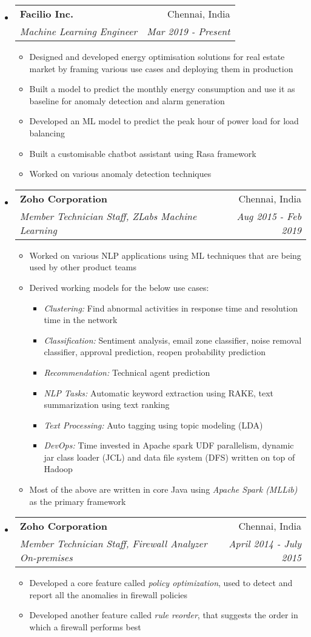 \documentclass[letterpaper,11pt]{article}
\makeatletter
\newcommand{\resitem}[1]{\item #1 \vspace{-2pt}}
\newcommand{\resheading}[1]{\textbf{\sffamily{\mbox{~}{\large #1} \vphantom{p\^{E}}}}}
\newcommand{\ressubheading}[4]{
\begin{tabular*}{6.5in}{l@{\extracolsep{\fill}}r}
		\textbf{#1} & #2 \\
		\textit{#3} & \textit{#4} \\
\end{tabular*}\vspace{-6pt}}
\makeatother
\begin{document}
\vspace{0.05in}
\resheading{Work Experience}
\vspace{-2mm}
\begin{itemize}
\item[]
	\ressubheading{Facilio Inc.}{Chennai, India}{Machine Learning Engineer}{Mar 2019 - Present}
	\begin{itemize}
		\resitem{Designed and developed energy optimisation solutions for real estate market by framing various use cases and deploying them in production}
		\resitem{Built a model to predict the monthly energy consumption and use it as baseline for anomaly detection and alarm generation}
		\resitem{Developed an ML model to predict the peak hour of power load for load balancing}
		\resitem{Built a customisable chatbot assistant using Rasa framework}
		\resitem{Worked on various anomaly detection techniques}
	\end{itemize}

\item[]
	\ressubheading{Zoho Corporation}{Chennai, India}{Member Technician Staff, ZLabs Machine Learning}{Aug 2015 - Feb 2019}
	\begin{itemize}
		\resitem{Worked on various NLP applications using ML techniques that are being used by other product teams}
		\resitem{{Derived working models for the below use cases:}}
		\begin{itemize}
			\resitem{\textit{Clustering:} Find abnormal activities in response time and resolution time in the network}
			\resitem{\textit{Classification:} Sentiment analysis, email zone classifier, noise removal classifier, approval prediction, reopen probability prediction}
			\resitem{\textit{Recommendation:} Technical agent prediction}
			\resitem{\textit{NLP Tasks:} Automatic keyword extraction using RAKE, text summarization using text ranking}
			\resitem{\textit{Text Processing:} Auto tagging using topic modeling (LDA)}
			\resitem{\textit{DevOps:} Time invested in Apache spark UDF parallelism, dynamic jar class loader (JCL) and data file system (DFS) written on top of Hadoop}

		\end{itemize}
		\resitem{Most of the above are written in core Java using \textit{Apache Spark (MLLib)} as the primary framework}
	\end{itemize}
	
\item[]
	\ressubheading{Zoho Corporation}{Chennai, India}{Member Technician Staff, Firewall Analyzer On-premises}{April 2014 - July 2015}
	\begin{itemize}
		\resitem{Developed a core feature called \textit{policy optimization}, used to detect and report all the anomalies in firewall policies}
		\resitem{Developed another feature called \textit{rule reorder}, that suggests the order in which a firewall performs best}


\end{itemize}
\end{itemize}
\end{document}
